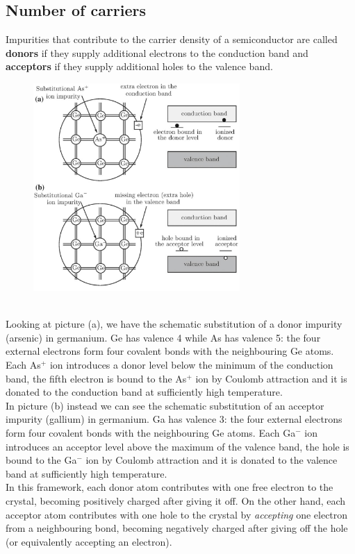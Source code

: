\documentclass[10.75pt,a4paper,openright,bottom=2cm]{article}
\begin{document}
\subsection{Number of carriers}
Impurities that contribute to the carrier density of a semiconductor are called \textbf{donors} if they supply additional electrons to the conduction band and \textbf{acceptors} if they supply additional holes to the valence band.
\begin{figure}[h]
    \centering
    \includegraphics[width=0.7\textwidth]{semiconductors.pdf}
    \label{fig:semiconductors}
\end{figure}\\
\noindent
Looking at picture (a), we have the schematic substitution of a donor impurity (arsenic) in germanium. Ge has valence 4 while As has valence 5: the four external electrons form four covalent bonds with the neighbouring Ge atoms. Each As$^+$ ion introduces a donor level below the minimum of the conduction band, the fifth electron is bound to the As$^+$ ion by Coulomb attraction and it is donated to the conduction band at sufficiently high temperature.\\
In picture (b) instead we can see the schematic substitution of an acceptor impurity (gallium) in germanium. Ga has valence 3: the four external electrons form four covalent bonds with the neighbouring Ge atoms. Each Ga$^-$ ion introduces an acceptor level above the maximum of the valence band, the hole is bound to the Ga$^-$ ion by Coulomb attraction and it is donated to the valence band at sufficiently high temperature.\\
In this framework, each donor atom contributes with one free electron to the crystal, becoming positively charged after giving it off. On the other hand, each acceptor atom contributes with one hole to the crystal by \textit{accepting} one electron from a neighbouring bond, becoming negatively charged after giving off the hole (or equivalently accepting an electron).\\
\end{document}
